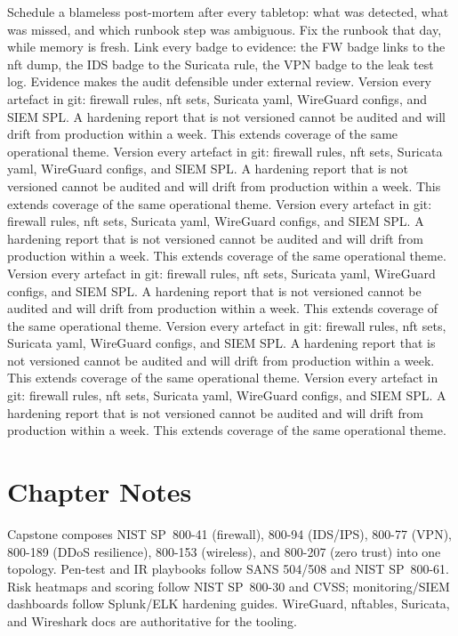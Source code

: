 Schedule a blameless post-mortem after every tabletop: what was detected, what was missed, and which runbook step was ambiguous. Fix the runbook that day, while memory is fresh.
Link every badge to evidence: the FW badge links to the nft dump, the IDS badge to the Suricata rule, the VPN badge to the leak test log. Evidence makes the audit defensible under external review.
Version every artefact in git: firewall rules, nft sets, Suricata yaml, WireGuard configs, and SIEM SPL. A hardening report that is not versioned cannot be audited and will drift from production within a week. This extends coverage of the same operational theme.
Version every artefact in git: firewall rules, nft sets, Suricata yaml, WireGuard configs, and SIEM SPL. A hardening report that is not versioned cannot be audited and will drift from production within a week. This extends coverage of the same operational theme.
Version every artefact in git: firewall rules, nft sets, Suricata yaml, WireGuard configs, and SIEM SPL. A hardening report that is not versioned cannot be audited and will drift from production within a week. This extends coverage of the same operational theme.
Version every artefact in git: firewall rules, nft sets, Suricata yaml, WireGuard configs, and SIEM SPL. A hardening report that is not versioned cannot be audited and will drift from production within a week. This extends coverage of the same operational theme.
Version every artefact in git: firewall rules, nft sets, Suricata yaml, WireGuard configs, and SIEM SPL. A hardening report that is not versioned cannot be audited and will drift from production within a week. This extends coverage of the same operational theme.
Version every artefact in git: firewall rules, nft sets, Suricata yaml, WireGuard configs, and SIEM SPL. A hardening report that is not versioned cannot be audited and will drift from production within a week. This extends coverage of the same operational theme.
\section*{Chapter Notes}
Capstone composes NIST SP~800-41 (firewall), 800-94 (IDS/IPS), 800-77 (VPN), 800-189 (DDoS resilience), 800-153 (wireless), and 800-207 (zero trust) into one topology. Pen-test and IR playbooks follow SANS 504/508 and NIST SP~800-61. Risk heatmaps and scoring follow NIST SP~800-30 and CVSS; monitoring/SIEM dashboards follow Splunk/ELK hardening guides. WireGuard, nftables, Suricata, and Wireshark docs are authoritative for the tooling.

